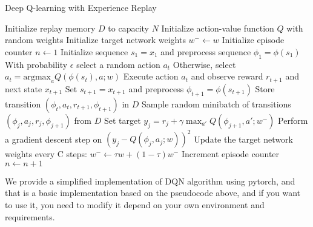 \documentclass{article}
\begin{document}
\begin{algorithm}
\caption{Deep Q-learning with Experience Replay}
\begin{algorithmic}
\State Initialize replay memory $D$ to capacity $N$
\State Initialize action-value function $Q$ with random weights
\State Initialize target network weights $w^- \leftarrow w$
\State Initialize episode counter $n \leftarrow 1$
    \State Initialize sequence $s_1 = x_1$ and preprocess sequence $\phi_1 = \phi(s_1)$
        \State With probability $\epsilon$ select a random action $a_t$
        \State Otherwise, select $a_t = \text{argmax}_a Q(\phi(s_t), a; w)$
        \State Execute action $a_t$ and observe reward $r_{t+1}$ and next state $x_{t+1}$
        \State Set $s_{t+1} = x_{t+1}$ and preprocess $\phi_{t+1} = \phi(s_{t+1})$
        \State Store transition $(\phi_t, a_t, r_{t+1}, \phi_{t+1})$ in $D$
        \State Sample random minibatch of transitions $(\phi_j, a_j, r_j, \phi_{j+1})$ from $D$
        \State Set target $y_j = r_j + \gamma \max_{a'} Q(\phi_{j+1}, a'; w^-)$
        \State Perform a gradient descent step on $(y_j - Q(\phi_j, a_j; w))^2$
    \EndFor
    \State Update the target network weights every C steps: $w^- \leftarrow \tau w + (1 - \tau) w^-$
    \State Increment episode counter $n \leftarrow n + 1$
\EndFor
\end{algorithmic}
\end{algorithm}

We provide a simplified implementation of DQN algorithm using pytorch, and that is a basic implementation based on the pseudocode above, and if you want to use it, you need to modify it depend on your own environment and requirements.
\end{document}

